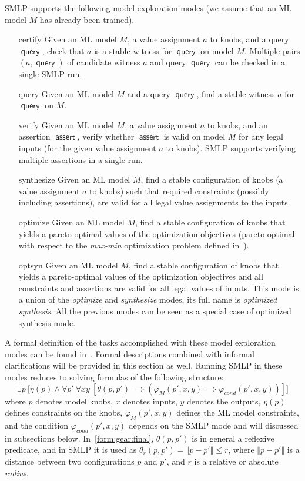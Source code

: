 \documentclass[a4paper,parskip=half]{article} %
\newcommand*\eqdef=
\newcommand*\query{\operatorname{\mathsf{query}}}
\newcommand*\assert{\operatorname{\mathsf{assert}}}
\begin{document}
SMLP supports the following model exploration modes (we assume that an ML model $M$ has already been trained). 
\begin{itemize}
\item[certify] Given an ML model $M$, a value assignment $a$ to knobs, and a query $\query$, check that $a$ is a stable 
witness for $\query$ on model $M$. Multiple pairs $(a,\query)$ of candidate witness $a$ and query $\query$ can be checked in a single SMLP run.
\item[query] Given an ML model $M$  and a query $\query$, find a stable witness $a$  for $\query$ on $M$.
\item[verify] Given an ML model $M$,  a value assignment $a$ to knobs,  and an assertion $\assert$, verify whether  
$\assert$ is valid on model $M$ for any legal inputs (for the given value assignment $a$ to knobs). SMLP supports verifying 
multiple assertions in a single run.
\item[synthesize] Given an ML model $M$,  find a stable configuration of knobs (a value assignment $a$ to knobs) 
such that required constraints (possibly including assertions),  are valid for all legal value assignments to the inputs.
\item[optimize]  Given an ML model $M$,  find a stable configuration of knobs that yields a pareto-optimal values of 
the optimization objectives (pareto-optimal with respect to the \emph{max-min} optimization problem defined in~\cite{brausse2024smlp}).
\item[optsyn] Given an ML model $M$,  find a stable configuration of knobs that yields a pareto-optimal values of the 
optimization objectives and all constraints and assertions are valid for all legal values of inputs. This mode is a union 
of the \emph{optimize} and \emph{synthesize} modes, its full name is \emph{optimized synthesis}. 
All the previous modes can be seen as a special case of optimized synthesis mode.
\end{itemize}

A formal definition of the tasks accomplished with these model exploration modes can be found in~\cite{brausse2024smlp}. 
Formal descriptions combined with informal clarifications will be provided in this section as well. 
Running SMLP in these modes reduces to solving formulas of the following structure:
\begin{equation}\label{form:gear:final}
    \exists p ~\big[ \eta(p) \wedge
    \forall p'~
    \forall x y~[
    \theta(p,p') \implies (\varphi_M(p',x,y)  \implies  \varphi_{\mathit{cond}}(p',x,y))
    ]\big]
\end{equation}
where $p$ denotes model knobs, $x$ denotes inputs, $y$ denotes the outputs, $\eta(p)$ defines 
constraints on the knobs,  $\varphi_M(p',x,y)$ defines the ML model constraints, and the 
condition $\varphi_{\mathit{cond}}(p',x,y)$ depends on the SMLP mode and will discussed in subsections below.
In~\cref{form:gear:final}, $\theta(p,p')$ is in general a reflexive predicate, and in SMLP it is used as 
$\theta_r(p, p') \eqdef \Vert p - p' \Vert \leq r$, where  $\Vert p - p' \Vert$ is a distance between 
two configurations $p$ and $p'$, and $r$ is a relative or absolute \emph{radius}.
\end{document}
